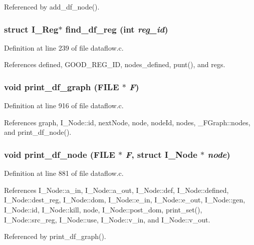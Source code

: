 Referenced by add\_\-df\_\-node().
\subsubsection{\setlength{\rightskip}{0pt plus 5cm}struct \bf{I\_\-Reg}$\ast$ find\_\-df\_\-reg (int {\em reg\_\-id})}\label{dataflow_8h_fd2051a50cece4bb251d07694aaaf671}




Definition at line 239 of file dataflow.c.

References defined, GOOD\_\-REG\_\-ID, nodes\_\-defined, punt(), and regs.
\subsubsection{\setlength{\rightskip}{0pt plus 5cm}void print\_\-df\_\-graph (FILE $\ast$ {\em F})}\label{dataflow_8h_3f0a2441aab00712f252b61f1ca9b703}




Definition at line 916 of file dataflow.c.

References graph, I\_\-Node::id, next\-Node, node, node\-Id, nodes, \_\-FGraph::nodes, and print\_\-df\_\-node().
\subsubsection{\setlength{\rightskip}{0pt plus 5cm}void print\_\-df\_\-node (FILE $\ast$ {\em F}, struct \bf{I\_\-Node} $\ast$ {\em node})}\label{dataflow_8h_17dc8a7db94edf7cfdca834b178bde2f}




Definition at line 881 of file dataflow.c.

References I\_\-Node::a\_\-in, I\_\-Node::a\_\-out, I\_\-Node::def, I\_\-Node::defined, I\_\-Node::dest\_\-reg, I\_\-Node::dom, I\_\-Node::e\_\-in, I\_\-Node::e\_\-out, I\_\-Node::gen, I\_\-Node::id, I\_\-Node::kill, node, I\_\-Node::post\_\-dom, print\_\-set(), I\_\-Node::src\_\-reg, I\_\-Node::use, I\_\-Node::v\_\-in, and I\_\-Node::v\_\-out.

Referenced by print\_\-df\_\-graph().
